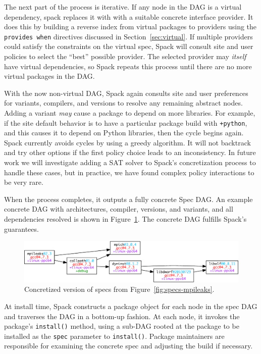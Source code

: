The next part of the process is iterative.
If any node in the DAG is a virtual dependency, spack replaces it with with a
suitable concrete interface provider.  It does this by building a reverse
index from virtual packages to providers using the {\tt provides when} 
directives discussed in Section~\ref{sec:virtual}. If multiple providers
could satisfy the constraints on the virtual spec, 
Spack will consult site and user policies to select the ``best'' possible
provider.  The selected provider may {\it itself} have virtual dependencies,
so Spack repeats this process until there are no more virtual packages
in the DAG.

With the now non-virtual DAG, Spack again consults site and user preferences for 
variants, compilers, and versions to resolve any remaining abstract nodes.
Adding a variant {\it may} cause a package to depend on more libraries. For example,
if the site default behavior is to have a particular package build with {\tt +python},
and this causes it to depend on Python libraries, then the cycle begins again.
Spack currently avoids cycles by using a greedy algorithm.  It will not backtrack and
try other options if the first policy choice leads to an inconsistency.  In future
work we will investigate adding a SAT solver to Spack's concretization process to
handle these cases, but in practice, we have found complex policy interactions to be
very rare.

When the process completes, it outputs a fully concrete Spec DAG.  An example 
concrete DAG with architectures, compiler, versions, and variants, and all 
dependencies resolved is shown in Figure~\ref{fig:specs-mpileaks-concrete}.
The concrete DAG fulfills Spack's guarantees.


\begin{figure}
	\centering
	\includegraphics[width=\columnwidth]{specs/mpileaks-concrete.pdf}
	\caption{
		Concretized version of specs from Figure~\ref{fig:specs-mpileaks}.
		\label{fig:specs-mpileaks-concrete}
	}
\end{figure}

At install time, Spack constructs a package object for each node in the spec DAG
and traverses the DAG in a bottom-up fashion.  At each node, it invokes the package's
{\tt install()} method, using a sub-DAG rooted at the package to be installed as the {\tt spec}
parameter to {\tt install()}. Package maintainers are responsible for examining the 
concrete spec and adjusting the build if necessary.

